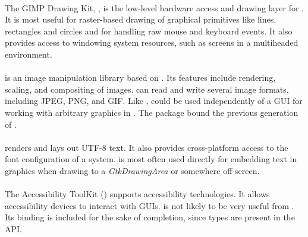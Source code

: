 \documentclass[article]{jss}
\begin{document}
\paragraph[GDK]{}

The GIMP Drawing Kit, , is the low-level hardware access and drawing layer 
for . It is most useful for raster-based drawing of graphical 
primitives like lines, rectangles and circles and for handling raw mouse and 
keyboard events. It also provides access to windowing system resources, such
as screens in a multiheaded environment.

\paragraph[GdkPixbuf]{}

 is an image manipulation library based on . Its features
include rendering, scaling, and compositing of images.  can read
and write several image formats, including JPEG, PNG, and GIF. Like ,
 could be used independently of a GUI for working with arbitrary 
graphics in . The  \citep{RGdkPixbuf} package bound
the previous generation of .

\paragraph[Pango]{}

 renders and lays out UTF-8 text. It also
provides cross-platform access to the font configuration of a system.
 is most often used directly for embedding text in graphics when drawing
to a \emph{GtkDrawingArea} or somewhere off-screen.

\paragraph[ATK]{} 

The Accessibility ToolKit () supports accessibility technologies. 
It allows accessibility devices to interact with  GUIs. 
is not likely to be very useful from . Its binding is included for the 
sake of completion, since  types are present in the  API.

\paragraph[Libglade]{}
\end{document}
